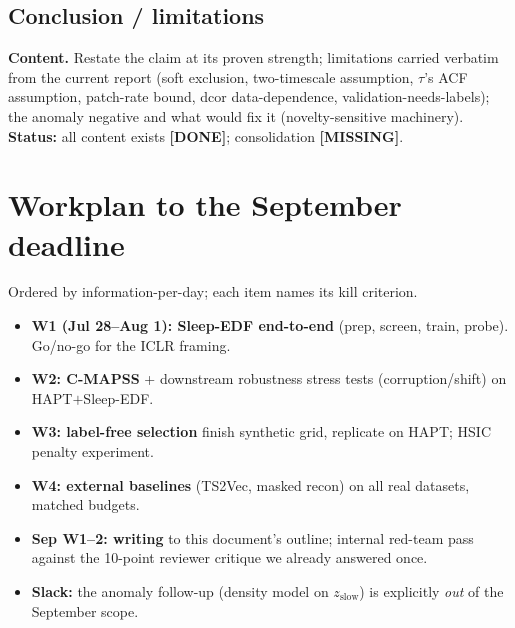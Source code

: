 \documentclass[10pt]{article}
\newcommand{\done}{\textcolor[rgb]{0,0.45,0}{\textbf{[DONE]}}}
\newcommand{\todo}{\textcolor[rgb]{0.75,0,0}{\textbf{[MISSING]}}}
\newcommand{\zslow}{z_{\mathrm{slow}}}
\begin{document}
\subsection{Conclusion / limitations}
\textbf{Content.} Restate the claim at its proven strength; limitations
carried verbatim from the current report (soft exclusion, two-timescale
assumption, $\tau$'s ACF assumption, patch-rate bound, dcor data-dependence,
validation-needs-labels); the anomaly negative and what would fix it
(novelty-sensitive machinery). \textbf{Status:} all content exists \done;
consolidation \todo.

\section{Workplan to the September deadline}
\label{sec:plan}
Ordered by information-per-day; each item names its kill criterion.
\begin{itemize}[leftmargin=1.3em,itemsep=1pt,topsep=2pt]
\item \textbf{W1 (Jul 28--Aug 1): Sleep-EDF end-to-end} (prep, screen,
train, probe). Go/no-go for the ICLR framing.
\item \textbf{W2: C-MAPSS} + downstream robustness stress tests
(corruption/shift) on HAPT$+$Sleep-EDF.
\item \textbf{W3: label-free selection} finish synthetic grid, replicate on
HAPT; HSIC penalty experiment.
\item \textbf{W4: external baselines} (TS2Vec, masked recon) on all real
datasets, matched budgets.
\item \textbf{Sep W1--2: writing} to this document's outline; internal
red-team pass against the 10-point reviewer critique we already answered
once.
\item \textbf{Slack:} the anomaly follow-up (density model on $\zslow$) is
explicitly \emph{out} of the September scope.
\end{itemize}
\end{document}
